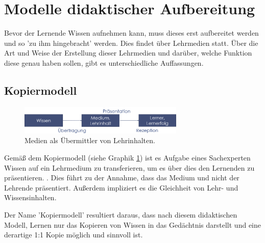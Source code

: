 \section{Modelle didaktischer Aufbereitung}
\label{sec:Lernmodelle}
Bevor der Lernende Wissen aufnehmen kann, muss dieses erst aufbereitet werden und so 'zu ihm hingebracht' werden. Dies findet über Lehrmedien statt. Über die Art und Weise der Erstellung dieser Lehrmedien und darüber, welche Funktion diese genau haben sollen, gibt es unterschiedliche Auffassungen. \cite[S. 145 ff.]{Kerres.2001}

\subsection{Kopiermodell}
\label{sub:Kopiermodell}
\begin{figure}[h]
	\centering
	\includegraphics[width=0.7\textwidth]{Abbildungen/Kopiermodell.PNG}
	\caption{Medien als Übermittler von Lehrinhalten. \cite[S. 146]{Kerres.2001}}
	\label{fig:Kerres2001_Kopiermodell}
\end{figure}
Gemäß dem Kopiermodell (siehe Graphik \ref{fig:Kerres2001_Kopiermodell}) ist es Aufgabe eines Sachexperten Wissen auf ein Lehrmedium zu transferieren, um es über dies den Lernenden zu präsentieren. \cite[S. 146]{Kerres.2001}. Dies führt zu der Annahme, dass das Medium und nicht der Lehrende präsentiert. Außerdem impliziert es die Gleichheit von Lehr- und Wissensinhalten. %

Der Name 'Kopiermodell' resultiert daraus, dass nach diesem didaktischen Modell, Lernen nur das Kopieren von Wissen in das Gedächtnis darstellt und eine derartige 1:1 Kopie möglich und sinnvoll ist. \cite[S. 145 f.]{Kerres.2001}


